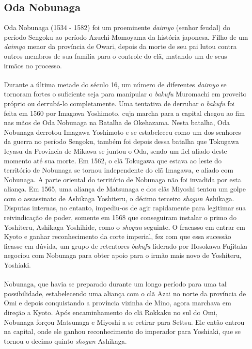 \documentclass[12pt, a4paper]{article}
\begin{document}
        \subsection {Oda Nobunaga}
            Oda Nobunaga (1534 - 1582) foi um proeminente \textit{daimyo} (senhor feudal) do período Sengoku ao período Azuchi-Momoyama da história japonesa. Filho de um \textit{daimyo} menor da província de Owari, depois da morte de seu pai lutou contra outros membros de sua família para o controle do clã, matando um de seus irmãos no processo.\\
            \\
            \indent Durante a última metade do século 16, um número de diferentes \textit{daimyo} se tornoram fortes o suficiente seja para manipular o \textit{bakufu} Muromachi em proveito próprio ou derrubá-lo completamente. Uma tentativa de derrubar o \textit{bakufu} foi feita em 1560 por Imagawa Yoshimoto, cuja marcha para a capital chegou ao fim nas mãos de Oda Nobunaga na Batalha de Okehazama. Nesta batalha, Oda Nobunaga derrotou Imagawa Yoshimoto e se estabeleceu como um dos senhores da guerra no período Sengoku, também foi depois dessa batalha que Tokugawa Ieyasu da Província de Mikawa se juntou o Oda, sendo um fiel aliado deste momento até sua morte. Em 1562, o clã Tokugawa que estava ao leste do território de Nobunaga se tornou independente do clã Imagawa, e aliado com Nobunaga. A parte oriental do território de Nobunaga não foi invadida por esta aliança. Em 1565, uma aliança de Matsunaga e dos clãs Miyoshi tentou um golpe com o assassinato de Ashikaga Yoshiteru, o décimo terceiro \textit{shogun} Ashikaga. Disputas internas, no entanto, impediu-os de agir rapidamente para legitimar sua reivindicação de poder, somente em 1568 que conseguiram instalar o primo do Yoshiteru, Ashikaga Yoshihide, como o \textit{shogun} seguinte. O fracasso em entrar em Kyoto e ganhar reconhecimento da corte imperial, fez com que essa sucessão ficasse em dúvida, um grupo de retentores \textit{bakufu} liderado por Hosokawa Fujitaka negociou com Nobunaga para obter apoio para o irmão mais novo de Yoshiteru, Yoshiaki.\\
            \\
            \indent Nobunaga, que havia se preparado durante um longo período para uma tal possibilidade, estabelecendo uma aliança com o clã Azai no norte da província de Omi e depois conquistando a província vizinha de Mino, agora marchava em direção a Kyoto. Após encaminhamento do clã Rokkaku no sul do Omi, Nobunaga forçou Matsunaga e Miyoshi a se retirar para Settsu. Ele então entrou na capital, onde ele ganhou reconhecimento do imperador para Yoshiaki, que se tornou o decimo quinto \textit{shogun} Ashikaga.\\
\end{document}
